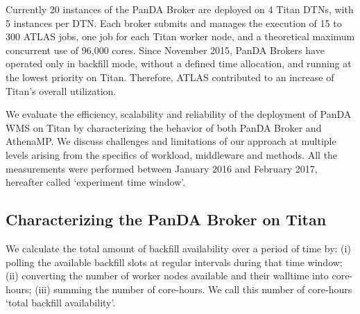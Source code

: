 \begin{enumerate}
\end{enumerate}
\fi

Currently 20 instances of the PanDA Broker are deployed on 4 Titan DTNs, with
5 instances per DTN\@. Each broker submits and manages the execution of 15 to
300 ATLAS jobs, one job for each Titan worker node, and a theoretical maximum
concurrent use of 96,000 cores. Since November 2015, PanDA Brokers have
operated only in backfill mode, without a defined time allocation, and
running at the lowest priority on Titan. Therefore, ATLAS contributed to an
increase of Titan's overall utilization.

We evaluate the efficiency, scalability and reliability of the deployment of
PanDA WMS on Titan by characterizing the behavior of both PanDA Broker and
AthenaMP\@. We discuss challenges and limitations of our approach at multiple
levels arising from the specifics of workload, middleware and methods. All
the measurements were performed between January 2016 and February 2017,
hereafter called `experiment time window'.

\subsection{Characterizing the PanDA Broker on Titan}\label{ssec:broker_titan}

We calculate the total amount of backfill availability over a period of time
by: (i) polling the available backfill slots at regular intervals during that
time window; (ii) converting the number of worker nodes available and their
walltime into core-hours; (iii) summing the number of core-hours. We call
this number of core-hours `total backfill availability'.


